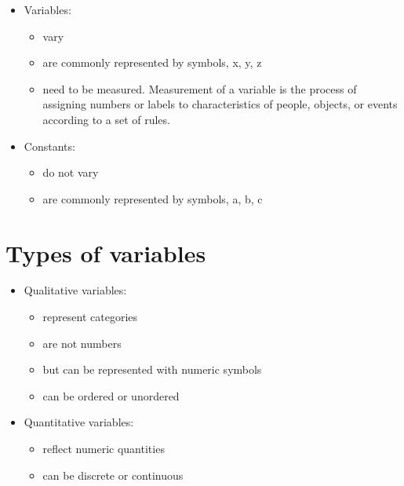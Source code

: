 \documentclass[12pt]{article}
\begin{document}
\begin{itemize}
\itemsep1pt\parskip0pt
\item
  Variables:

  \begin{itemize}
  \itemsep1pt\parskip0pt
  \item
    vary
  \item
    are commonly represented by symbols, x, y, z
  \item
    need to be measured. Measurement of a variable is the process of
    assigning numbers or labels to characteristics of people, objects,
    or events according to a set of rules.
  \end{itemize}
\item
  Constants:

  \begin{itemize}
  \itemsep1pt\parskip0pt
  \item
    do not vary
  \item
    are commonly represented by symbols, a, b, c
  \end{itemize}
\end{itemize}

\section{Types of variables}\label{types-of-variables}

\begin{itemize}
\itemsep1pt\parskip0pt
\item
  Qualitative variables:

  \begin{itemize}
  \itemsep1pt\parskip0pt
  \item
    represent categories
  \item
    are not numbers
  \item
    but can be represented with numeric symbols
  \item
    can be ordered or unordered
  \end{itemize}
\item
  Quantitative variables:

  \begin{itemize}
  \itemsep1pt\parskip0pt
  \item
    reflect numeric quantities
  \item
    can be discrete or continuous
  \end{itemize}
\end{itemize}
\end{document}
